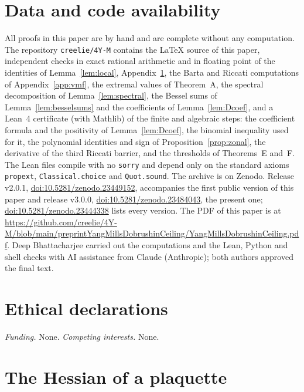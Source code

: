 \documentclass[aps,prd,twocolumn,superscriptaddress,nofootinbib,longbibliography,floatfix,amsmath,amssymb,10pt]{revtex4-2}
\theoremstyle{definition}
\theoremstyle{remark}
\begin{document}
\section*{Data and code availability}

All proofs in this paper are by hand and are complete without any
computation. The repository \texttt{creelie/4Y-M} contains the \LaTeX{}
source of this paper, independent checks in exact rational arithmetic and in
floating point of the identities of Lemma~\ref{lem:local},
Appendix~\ref{app:hessian}, the Barta and Riccati computations of
Appendix~\ref{app:vmf}, the extremal values of Theorem~A, the spectral
decomposition of Lemma~\ref{lem:spectral}, the Bessel sums of Lemma~\ref{lem:besselsums} and the
coefficients of Lemma~\ref{lem:Dcoef}, and a Lean~4 certificate (with
Mathlib) of the finite and algebraic steps: the coefficient formula and the
positivity of Lemma~\ref{lem:Dcoef}, the binomial inequality used for it, the
polynomial identities and sign of Proposition~\ref{prop:zonal}, the
derivative of the third Riccati barrier, and the thresholds of Theorems~E
and~F. The Lean files compile with no \texttt{sorry} and depend only on the
standard axioms \texttt{propext}, \texttt{Classical.choice} and
\texttt{Quot.sound}. The archive is on Zenodo. Release v2.0.1,
\href{https://doi.org/10.5281/zenodo.23449152}{doi:10.5281/zenodo.23449152},
accompanies the first public version of this paper and release v3.0.0,
\href{https://doi.org/10.5281/zenodo.23484043}{doi:10.5281/zenodo.23484043},
the present one;
\href{https://doi.org/10.5281/zenodo.23444338}{doi:10.5281/zenodo.23444338}
lists every version. The PDF of this paper is at
\url{https://github.com/creelie/4Y-M/blob/main/preprintYangMillsDobrushinCeiling/YangMillsDobrushinCeiling.pdf}.
Deep Bhattacharjee carried out the computations and the Lean, Python and
shell checks with AI assistance from Claude (Anthropic); both authors
approved the final text.

\section*{Ethical declarations}

\emph{Funding.} None. \emph{Competing interests.} None.

\appendix

\section{The Hessian of a plaquette}\label{app:hessian}
\end{document}
